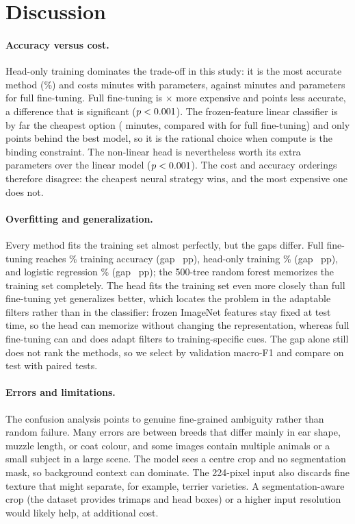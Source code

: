 \documentclass[10pt]{article}
\begin{document}
\section{Discussion}
\paragraph{Accuracy versus cost.}
Head-only training dominates the trade-off in this study: it is the most accurate method
(\headAcc\%) and costs \headTime{} minutes with \headParams{} parameters, against
\fullTime{} minutes and \fullParams{} parameters for full fine-tuning. Full fine-tuning
is \timeRatioFH$\times$ more expensive and \fullHeadDiff{} points less accurate, a
difference that is significant ($p<0.001$). The frozen-feature linear classifier is
by far the cheapest option (\lrTime{} minutes, compared with \fullTime{} for full
fine-tuning) and only \headLrDiff{} points behind the best model, so it is the rational
choice when compute is the binding constraint. The non-linear head is nevertheless worth
its extra parameters over the linear model ($p<0.001$). The cost and accuracy
orderings therefore disagree: the cheapest neural strategy wins, and the most expensive
one does not.

\paragraph{Overfitting and generalization.}
Every method fits the training set almost perfectly, but the gaps differ. Full
fine-tuning reaches \fullTrainAcc\% training accuracy (gap \fullGap{}~pp), head-only
training \headTrainAcc\% (gap \headGap{}~pp), and logistic regression \lrTrainAcc\%
(gap \lrGap{}~pp); the 500-tree random forest memorizes the training set completely. The
head fits the training set even more closely than full fine-tuning yet generalizes
better, which locates the problem in the adaptable filters rather than in the classifier:
frozen ImageNet features stay fixed at test time, so the head can memorize without
changing the representation, whereas full fine-tuning can and does adapt filters to
training-specific cues. The gap alone still does not rank the methods, so we select by
validation macro-F1 and compare on test with paired tests.

\paragraph{Errors and limitations.}
The confusion analysis points to genuine fine-grained ambiguity rather than random
failure. Many errors are between breeds that differ mainly in ear shape, muzzle length, or
coat colour, and some images contain multiple animals or a small subject in a large
scene. The model sees a centre crop and no segmentation mask, so background context can
dominate. The 224-pixel input also discards fine texture that might separate, for
example, terrier varieties. A segmentation-aware crop (the dataset provides trimaps and
head boxes) or a higher input resolution would likely help, at additional cost.
\end{document}
